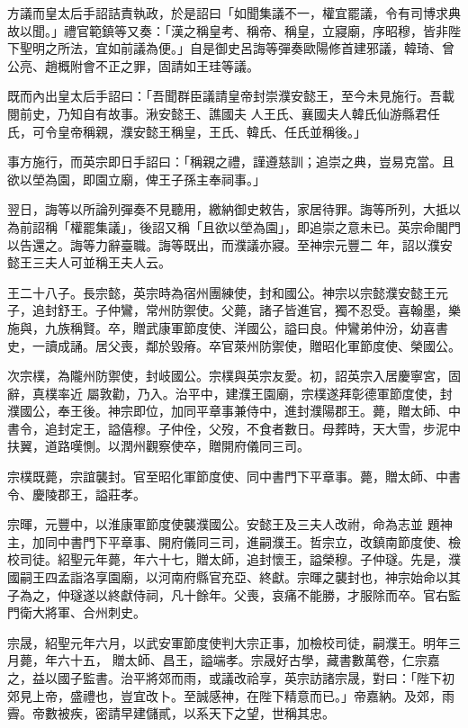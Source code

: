 \begin{pinyinscope}
 方議而皇太后手詔詰責執政，於是詔曰「如聞集議不一，權宜罷議，令有司博求典故以聞。」禮官範鎮等又奏：「漢之稱皇考、稱帝、稱皇，立寢廟，序昭穆，皆非陛下聖明之所法，宜如前議為便。」自是御史呂誨等彈奏歐陽修首建邪議，韓琦、曾公亮、趙概附會不正之罪，固請如王珪等議。



 既而內出皇太后手詔曰：「吾聞群臣議請皇帝封崇濮安懿王，至今未見施行。吾載閱前史，乃知自有故事。湫安懿王、譙國夫
 人王氏、襄國夫人韓氏仙游縣君任氏，可令皇帝稱親，濮安懿王稱皇，王氏、韓氏、任氏並稱後。」



 事方施行，而英宗即日手詔曰：「稱親之禮，謹遵慈訓；追崇之典，豈易克當。且欲以塋為園，即園立廟，俾王子孫主奉祠事。」



 翌日，誨等以所論列彈奏不見聽用，繳納御史敕告，家居待罪。誨等所列，大抵以為前詔稱「權罷集議」，後詔又稱「且欲以塋為園」，即追崇之意未已。英宗命閣門以告還之。誨等力辭臺職。誨等既出，而濮議亦寢。至神宗元豐二
 年，詔以濮安懿王三夫人可並稱王夫人云。



 王二十八子。長宗懿，英宗時為宿州團練使，封和國公。神宗以宗懿濮安懿王元子，追封舒王。子仲鸞，常州防禦使。父薨，諸子皆進官，獨不忍受。喜翰墨，樂施與，九族稱賢。卒，贈武康軍節度使、洋國公，謚曰良。仲鸞弟仲汾，幼喜書史，一讀成誦。居父喪，鄰於毀瘠。卒官萊州防禦使，贈昭化軍節度使、榮國公。



 次宗樸，為隴州防禦使，封岐國公。宗樸與英宗友愛。初，詔英宗入居慶寧宮，固辭，真樸率近
 屬敦勸，乃入。治平中，建濮王園廟，宗樸遂拜彰德軍節度使，封濮國公，奉王後。神宗即位，加同平章事兼侍中，進封濮陽郡王。薨，贈太師、中書令，追封定王，謚僖穆。子仲佺，父歿，不食者數日。母葬時，天大雪，步泥中扶翼，道路嘆惻。以潤州觀察使卒，贈開府儀同三司。



 宗樸既薨，宗誼襲封。官至昭化軍節度使、同中書門下平章事。薨，贈太師、中書令、慶陵郡王，謚莊孝。



 宗暉，元豐中，以淮康軍節度使襲濮國公。安懿王及三夫人改祔，命為志並
 題神主，加同中書門下平章事、開府儀同三司，進嗣濮王。哲宗立，改鎮南節度使、檢校司徒。紹聖元年薨，年六十七，贈太師，追封懷王，謚榮穆。子仲璲。先是，濮國嗣王四孟詣洛享園廟，以河南府縣官充亞、終獻。宗暉之襲封也，神宗始命以其子為之，仲璲遂以終獻侍祠，凡十餘年。父喪，哀痛不能勝，才服除而卒。官右監門衛大將軍、合州刺史。



 宗晟，紹聖元年六月，以武安軍節度使判大宗正事，加檢校司徒，嗣濮王。明年三月薨，年六十五，
 贈太師、昌王，謚端孝。宗晟好古學，藏書數萬卷，仁宗嘉之，益以國子監書。治平將郊而雨，或議改祫享，英宗訪諸宗晟，對曰：「陛下初郊見上帝，盛禮也，豈宜改卜。至誠感神，在陛下精意而已。」帝嘉納。及郊，雨霽。帝數被疾，密請早建儲貳，以系天下之望，世稱其忠。




\end{pinyinscope}
